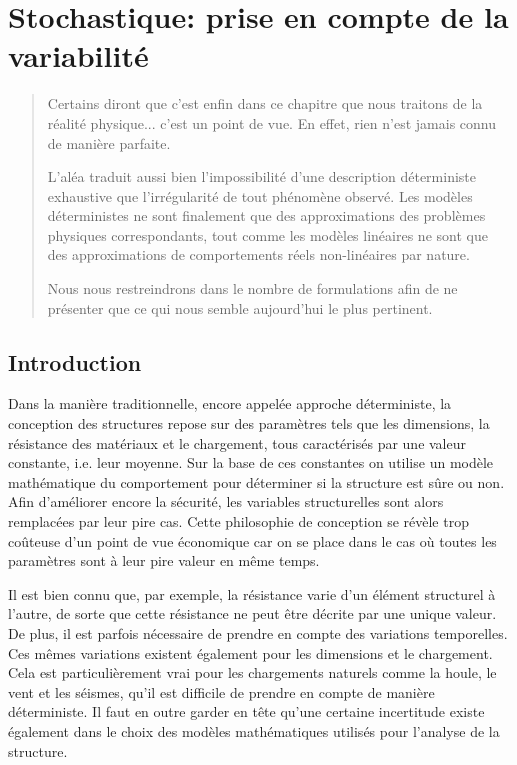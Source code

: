 \chapter{Stochastique: prise en compte de la variabilité}\label{Ch-stocha}
\begin{abstract}
Certains diront que c'est enfin dans ce chapitre que nous traitons de la réalité physique... c'est un point de vue.
En effet, rien n'est jamais connu de manière parfaite.

L'aléa traduit aussi bien l'impossibilité d'une description déterministe exhaustive que l'irrégularité de tout phénomène observé.
Les modèles déterministes ne sont finalement que des approximations des problèmes physiques correspondants, tout comme les modèles linéaires ne sont que des approximations de comportements réels non-linéaires par nature.

Nous nous restreindrons dans le nombre de formulations afin de ne présenter que ce qui nous semble aujourd'hui le plus pertinent.
\end{abstract}

\section{Introduction}

Dans la manière traditionnelle, encore appelée approche déterministe, la conception des structures repose sur des paramètres tels que les dimensions, la résistance des matériaux et le chargement, tous caractérisés par une valeur constante, i.e. leur moyenne. Sur la base de ces constantes on utilise un modèle mathématique du comportement pour déterminer si la structure est sûre ou non. Afin d'améliorer encore la sécurité, les variables structurelles sont alors remplacées par leur pire cas. Cette philosophie de conception se révèle trop coûteuse d'un point de vue économique car on se place dans le cas où toutes les paramètres sont à leur pire valeur en même temps. 

Il est bien connu que, par exemple, la résistance varie d'un élément structurel à l'autre, de sorte que cette résistance ne peut être décrite par une unique valeur. De plus, il est parfois nécessaire de prendre en compte des variations temporelles. Ces mêmes variations existent également pour les dimensions et le chargement. Cela est particulièrement vrai pour les chargements naturels comme la houle, le vent et les séismes, qu'il est difficile de prendre en compte de manière déterministe. Il faut en outre garder en tête qu'une certaine incertitude existe également dans le choix des modèles mathématiques utilisés pour l'analyse de la structure.

